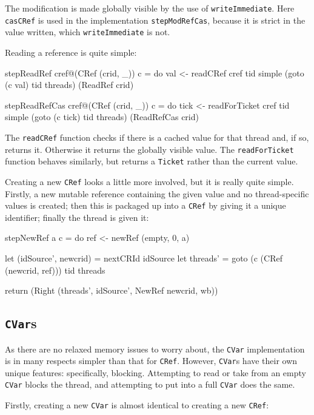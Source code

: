 The modification is made globally visible by the use of
\verb|writeImmediate|. Here \verb|casCRef| is used in the
implementation \verb|stepModRefCas|, because it is strict in the value
written, which \verb|writeImmediate| is not.

Reading a reference is quite simple:

\begin{haskellcode}
stepReadRef cref@(CRef (crid, _)) c = do
  val <- readCRef cref tid
  simple (goto (c val) tid threads) (ReadRef crid)

stepReadRefCas cref@(CRef (crid, _)) c = do
  tick <- readForTicket cref tid
  simple (goto (c tick) tid threads) (ReadRefCas crid)
\end{haskellcode}

The \verb|readCRef| function checks if there is a cached value for
that thread and, if so, returns it. Otherwise it returns the globally
visible value. The \verb|readForTicket| function behaves similarly,
but returns a \verb|Ticket| rather than the current value.

Creating a new \verb|CRef| looks a little more involved, but it is
really quite simple. Firstly, a new mutable reference containing the
given value and no thread-specific values is created; then this is
packaged up into a \verb|CRef| by giving it a unique identifier;
finally the thread is given it:
\pagebreak
\begin{haskellcode}
stepNewRef a c = do
  ref <- newRef (empty, 0, a)

  let (idSource', newcrid) = nextCRId idSource
  let threads' = goto (c (CRef (newcrid, ref))) tid threads

  return (Right (threads', idSource', NewRef newcrid, wb))
\end{haskellcode}

\subsection{\texttt{CVar}s}
\label{sec:execution-stepwise-cvar}

As there are no relaxed memory issues to worry about, the \verb|CVar|
implementation is in many respects simpler than that for
\verb|CRef|. However, \verb|CVar|s have their own unique features:
specifically, blocking. Attempting to read or take from an empty
\verb|CVar| blocks the thread, and attempting to put into a full
\verb|CVar| does the same.

Firstly, creating a new \verb|CVar| is almost identical to creating a
new \verb|CRef|:

